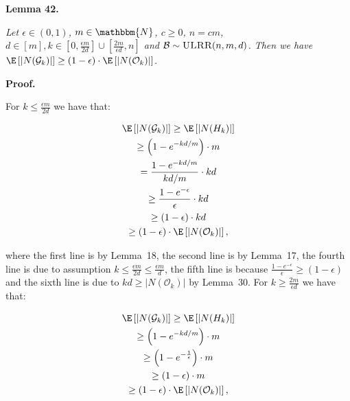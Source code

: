 \documentclass[10pt,a4paper]{article}
\begin{document}
\par\medskip\noindent\textbf{\textbf{Lemma 42}\textbf{.}}\par



\emph{Let $\epsilon\in(0,1)$, $m\in\mathbbm{N}$, $c\geq 0$, $n=cm$, $d\in[m],k\in\left[0,\frac{\epsilon m}{2d}\right]\cup\left[\frac{2m}{\epsilon d},n\right]$ and $\mathcal{B}\sim\textsc{ULRR}(n,m,d)$.
Then we have $\E\left[|N(\mathcal{G}_{k})|\right]\geq\left(1-\epsilon\right)\cdot\E\left[|N(\mathcal{O}_{k})|\right]$.}\par






\par\medskip\noindent\textbf{Proof.}\par



For $k\leq\frac{\epsilon m}{2d}$ we have that:\par


\[\begin{gathered}
\displaystyle\E\left[|N(\mathcal{G}_{k})|\right] \displaystyle\geq\E\left[|N(H_{k})|\right] \\
\displaystyle\geq\left(1-e^{-kd/m}\right)\cdot m \\
\displaystyle=\frac{1-e^{-kd/m}}{kd/m}\cdot kd \\
\displaystyle\geq\frac{1-e^{-\epsilon}}{\epsilon}\cdot kd \\
\displaystyle\geq\left(1-\epsilon\right)\cdot kd \\
\displaystyle\geq\left(1-\epsilon\right)\cdot\E\left[|N(\mathcal{O}_{k})|\right],
\end{gathered}\]


where the first line is by Lemma 18, the second line is by Lemma 17, the fourth line is due to assumption $k\leq\frac{\epsilon m}{2d}\leq\frac{\epsilon m}{d}$, the fifth line is because $\frac{1-e^{-\epsilon}}{\epsilon}\geq(1-\epsilon)$ and the sixth line is due to $kd\geq|N(\mathcal{O}_{k})|$ by Lemma 30.
For $k\geq\frac{2m}{\epsilon d}$ we have that:\par


\[\begin{gathered}
\displaystyle\E\left[|N(\mathcal{G}_{k})|\right] \displaystyle\geq\E\left[|N(H_{k})|\right] \\
\displaystyle\geq\left(1-e^{-kd/m}\right)\cdot m \\
\displaystyle\geq\left(1-e^{-\frac{1}{\epsilon}}\right)\cdot m \\
\displaystyle\geq\left(1-\epsilon\right)\cdot m \\
\displaystyle\geq\left(1-\epsilon\right)\cdot\E\left[|N(\mathcal{O}_{k})|\right],
\end{gathered}\]
\end{document}
